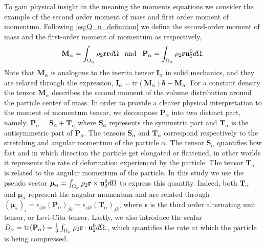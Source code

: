 To gain physical insight in the meaning the moments equations we consider the example of the second order moment of mass and first order moment of momentum.
Following \ref{eq:Q_n_definition} we define the second-order moment of mass and the first-order moment of momentum as respectively,
\begin{equation}
    \textbf{M}_\alpha 
    = \int_{\Omega_\alpha}  \rho_2 \textbf{r} \textbf{r}  d\Omega
    \;\;\;\text{and}\;\;\;
    \textbf{P}_\alpha 
    = \int_{\Omega_\alpha}  \rho_2 \textbf{r} \textbf{u}_2^0  d\Omega.
    \label{eq:first_moment_of_momentum_def}
\end{equation}
Note that $\textbf{M}_\alpha$ is analogous to the inertia tensor $\textbf{I}_\alpha$ in solid mechanics, and they are related through the expression, $\textbf{I}_\alpha = \text{tr}(\textbf{M}_\alpha)\bm\delta - \textbf{M}_\alpha$.
For a constant density the tensor $\textbf{M}_\alpha$ describes the second moment of the volume distribution around the particle center of mass.
In order to provide a clearer physical interpretation to the moment of momentum tensor, we decompose $\textbf{P}_\alpha$ into two distinct part, namely,
$\textbf{P}_\alpha = \textbf{S}_\alpha+\textbf{T}_\alpha$ where $\textbf{S}_\alpha$ represents the symmetric part and $\textbf{T}_\alpha$ is the antisymmetric part of $\textbf{P}_\alpha$.
The tensors $\textbf{S}_\alpha$ and $\textbf{T}_\alpha$ correspond respectively to the stretching and angular momentum of the particle $\alpha$. 
The tensor $\textbf{S}_\alpha$ quantifies how fast and in which direction the particle get elongated or flattened, in other worlds it represents the rate of deformation experienced by the particle.
The tensor $\textbf{T}_\alpha$ is related to the angular momentum of the particle. 
In this study we use the pseudo vector $\bm{\mu}_\alpha = \int_{\Omega_\alpha}  \rho_2 \textbf{r} \times \textbf{u}_2^0  d\Omega$ to express this quantity. 
Indeed, both  $\textbf{T}_\alpha$ and $\bm{\mu}_\alpha$ represent the angular momentum and are related through $(\bm{\mu}_\alpha)_i = \epsilon_{ijk} (\textbf{P}_\alpha)_{jk}= \epsilon_{ijk} (\textbf{T}_\alpha)_{jk}$, where $\bm\epsilon$ is the third order alternating unit tensor, or Levi-Cita tensor. 
Lastly, we also introduce the scalar $D_\alpha = \text{tr}(\textbf{P}_\alpha) = \frac{1}{3}\int_{\Omega_\alpha}  \rho_2 \textbf{r} \cdot \textbf{u}_2^0  d\Omega.$, which quantifies the rate at which the particle is being compressed.


